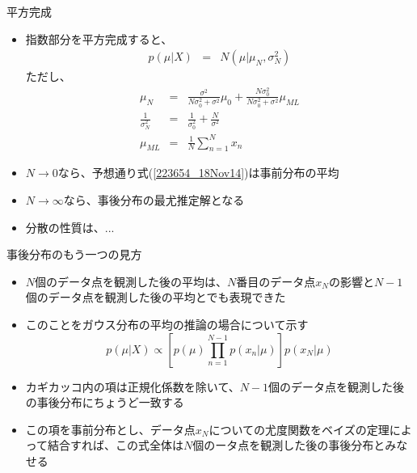 \begin{frame}{平方完成}
 \begin{itemize}
  \item 指数部分を平方完成すると、
        \begin{eqnarray}
         p(\mu|X)&=&N(\mu|\mu_N,\sigma_N^2)
        \end{eqnarray}
        ただし、
        \begin{eqnarray}
         \mu_N& = & \frac{\sigma^2}{N\sigma_0^2+\sigma^2}\mu_0 + \frac{N\sigma_0^2}{N\sigma_0^2+\sigma^2}\mu_{ML}\label{223654_18Nov14}\\
         \frac{1}{\sigma_N^2}&= & \frac{1}{\sigma_0^2} + \frac{N}{\sigma^2}\\
         \mu_{ML}&= & \frac{1}{N}\sum_{n=1}^{N}x_n
        \end{eqnarray}
  \item $N\rightarrow0$なら、予想通り式(\ref{223654_18Nov14})は事前分布の平均
  \item $N\rightarrow\infty$なら、事後分布の最尤推定解となる
  \item 分散の性質は、... %
 \end{itemize}
\end{frame}

\begin{frame}{事後分布のもう一つの見方}
 \begin{itemize}
  \item $N$個のデータ点を観測した後の平均は、$N$番目のデータ点$x_N$の影響と$N-1$個のデータ点を観測した後の平均とでも表現できた
  \item このことをガウス分布の平均の推論の場合について示す
        \begin{equation}
         p(\mu|X) \propto \left[p(\mu)\prod_{n=1}^{N-1}p(x_n|\mu)\right]p(x_N|\mu)
        \end{equation}
  \item カギカッコ内の項は正規化係数を除いて、$N-1$個のデータ点を観測した後の事後分布にちょうど一致する
  \item この項を事前分布とし、データ点$x_N$についての尤度関数をベイズの定理によって結合すれば、この式全体は$N$個のータ点を観測した後の事後分布とみなせる
 \end{itemize}
\end{frame}

